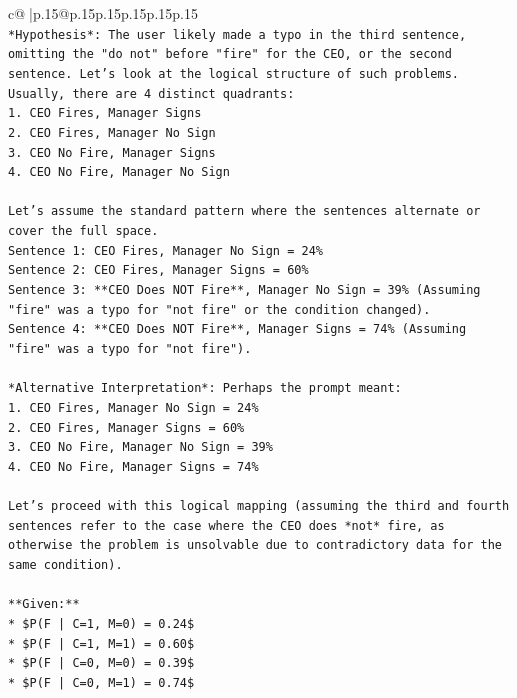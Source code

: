 \documentclass{article}
\begin{document}
{\begin{supertabular}{c@{$\;$}|p{.15\linewidth}@{}p{.15\linewidth}p{.15\linewidth}p{.15\linewidth}p{.15\linewidth}p{.15\linewidth}}
{{{\\ 
\texttt{*Hypothesis*: The user likely made a typo in the third sentence, omitting the "do not" before "fire" for the CEO, or the second sentence. Let's look at the logical structure of such problems. Usually, there are 4 distinct quadrants:} \\
\texttt{1. CEO Fires, Manager Signs} \\
\texttt{2. CEO Fires, Manager No Sign} \\
\texttt{3. CEO No Fire, Manager Signs} \\
\texttt{4. CEO No Fire, Manager No Sign} \\
\\ 
\texttt{Let's assume the standard pattern where the sentences alternate or cover the full space.} \\
\texttt{Sentence 1: CEO Fires, Manager No Sign = 24\%} \\
\texttt{Sentence 2: CEO Fires, Manager Signs = 60\%} \\
\texttt{Sentence 3: **CEO Does NOT Fire**, Manager No Sign = 39\% (Assuming "fire" was a typo for "not fire" or the condition changed).} \\
\texttt{Sentence 4: **CEO Does NOT Fire**, Manager Signs = 74\% (Assuming "fire" was a typo for "not fire").} \\
\\ 
\texttt{*Alternative Interpretation*: Perhaps the prompt meant:} \\
\texttt{1. CEO Fires, Manager No Sign = 24\%} \\
\texttt{2. CEO Fires, Manager Signs = 60\%} \\
\texttt{3. CEO No Fire, Manager No Sign = 39\%} \\
\texttt{4. CEO No Fire, Manager Signs = 74\%} \\
\\ 
\texttt{Let's proceed with this logical mapping (assuming the third and fourth sentences refer to the case where the CEO does *not* fire, as otherwise the problem is unsolvable due to contradictory data for the same condition).} \\
\\ 
\texttt{**Given:**} \\
\texttt{*   \$P(F | C=1, M=0) = 0.24\$} \\
\texttt{*   \$P(F | C=1, M=1) = 0.60\$} \\
\texttt{*   \$P(F | C=0, M=0) = 0.39\$} \\
\texttt{*   \$P(F | C=0, M=1) = 0.74\$} \\
}}}
\end{supertabular}}
\end{document}
